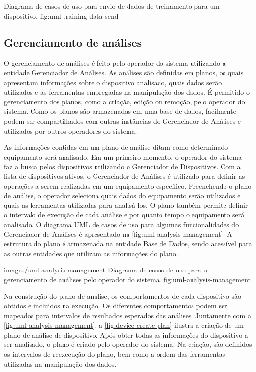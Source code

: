   {Diagrama de casos de uso para envio de dados de treinamento para um dispositivo.}
  {fig:uml-training-data-send}


\subsection{Gerenciamento de análises}

O gerenciamento de análises é feito pelo operador do sistema utilizando a entidade Gerenciador de
Análises. As análises são definidas em planos, os quais apresentam informações sobre o dispositivo
analisado, quais dados serão utilizados e as ferramentas empregadas na manipulação dos dados. É
permitido o gerenciamento dos planos, como a criação, edição ou remoção, pelo operador do sistema.
Como os planos são armazenadas em uma base de dados, facilmente podem ser compartilhados com outras
instâncias do Gerenciador de Análises e utilizados por outros operadores do sistema.

As informações contidas em um plano de análise ditam como determinado equipamento será analisado. Em
um primeiro momento, o operador do sistema faz a busca pelos dispositivos utilizando o Gerenciador
de Dispositivos. Com a lista de dispositivos ativos, o Gerenciador de Análises é utilizado para
definir as operações a serem realizadas em um equipamento específico. Preenchendo o plano de
análise, o operador seleciona quais dados do equipamento serão utilizados e quais as ferramentas
utilizadas para analisá-los. O plano também permite definir o intervalo de execução de cada análise
e por quanto tempo o equipamento será analisado. O diagrama \gls{UML} de casos de uso para algumas
funcionalidades do Gerenciador de Análises é apresentado na \cref{fig:uml-analysis-management}. A
estrutura do plano é armazenada na entidade Base de Dados, sendo acessível para as outras entidades
que utilizam as informações do plano.


  {images/uml-analysis-management}
  {Diagrama de casos de uso para o gerenciamento de análises pelo operador do sistema.}
  {fig:uml-analysis-management}

Na construção do plano de análise, os comportamentos de cada dispositivo são obtidos e incluídos na
execução. Os diferentes comportamentos podem ser mapeados para intervalos de resultados esperados
das análises. Juntamente com a \cref{fig:uml-analysis-management}, a \cref{fig:device-create-plan}
ilustra a criação de um plano de análise de dispositivo. Após obter todas as informações do
dispositivo a ser analisado, o plano é criado pelo operador do sistema. Na criação, são definidos os
intervalos de reexecução do plano, bem como a ordem das ferramentas utilizadas na manipulação dos
dados.

